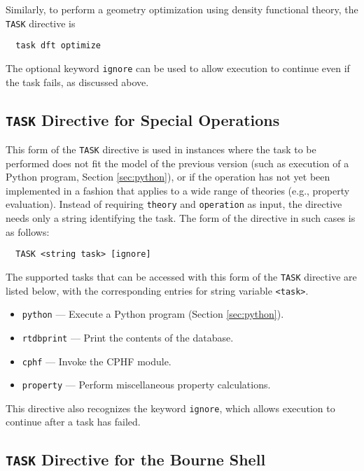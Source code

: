 Similarly, to perform a geometry optimization using density functional
theory, the \verb+TASK+ directive is
\begin{verbatim}
  task dft optimize
\end{verbatim}

The optional keyword \verb+ignore+ can be used to allow execution to
continue even if the task fails, as discussed above.

\subsection{{\tt TASK} Directive for Special Operations}

This form of the \verb+TASK+ directive is used in instances where the
task to be performed does not fit the model of the previous version
(such as execution of a Python program, Section \ref{sec:python}), or
if the operation has not yet been implemented in a fashion that
applies to a wide range of theories (e.g., property evaluation).
Instead of requiring \verb+theory+ and \verb+operation+ as input, the
directive needs only a string identifying the task.  The form of the
directive in such cases is as follows:

\begin{verbatim}
  TASK <string task> [ignore]
\end{verbatim}

The supported tasks that can be accessed with this form of the \verb+TASK+
directive are listed
below, with the corresponding entries for string variable \verb+<task>+.

\begin{itemize}
  \item \verb+python+ --- Execute a Python program (Section \ref{sec:python}).
  \item \verb+rtdbprint+ --- Print the contents of the database.
  \item \verb+cphf+ --- Invoke the CPHF module.
  \item \verb+property+ --- Perform miscellaneous property calculations.
\end{itemize}

This directive also recognizes the keyword \verb+ignore+, which allows
execution to continue after a task has failed.

\subsection{{\tt TASK} Directive for the Bourne Shell}

